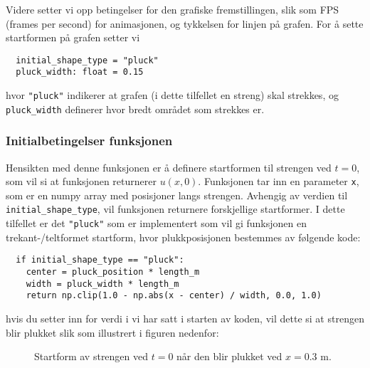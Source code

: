 Videre setter vi opp betingelser for den grafiske fremstillingen, slik som FPS (frames per second) for animasjonen, og
tykkelsen for linjen på grafen. For å sette startformen på grafen setter vi 

\begin{lstlisting}
  initial_shape_type = "pluck"
  pluck_width: float = 0.15
\end{lstlisting}

hvor \verb|"pluck"| indikerer at grafen (i dette tilfellet en streng) skal strekkes, og \verb|pluck_width| definerer hvor bredt området som strekkes er.

\subsubsection{Initialbetingelser funksjonen}
Hensikten med denne funksjonen er å definere startformen til strengen ved $t=0$, som vil si at funksjonen returnerer $u(x,0)$.
Funksjonen tar inn en parameter \verb|x|, som er en numpy array med posisjoner langs strengen. Avhengig av verdien til
\verb|initial_shape_type|, vil funksjonen returnere forskjellige startformer. I dette tilfellet er det \verb|"pluck"| 
som er implementert som vil gi funksjonen en trekant-/teltformet startform, hvor plukkposisjonen bestemmes av følgende 
kode:

\begin{lstlisting}
  if initial_shape_type == "pluck":
    center = pluck_position * length_m
    width = pluck_width * length_m
    return np.clip(1.0 - np.abs(x - center) / width, 0.0, 1.0)
\end{lstlisting}

hvis du setter inn for verdi i vi har satt i starten av koden, vil dette si at strengen blir plukket slik som 
illustrert i figuren nedenfor:

\begin{figure}[H]
    \centering
    \caption{Startform av strengen ved $t=0$ når den blir plukket ved $x=0.3$ m.}
\end{figure}

